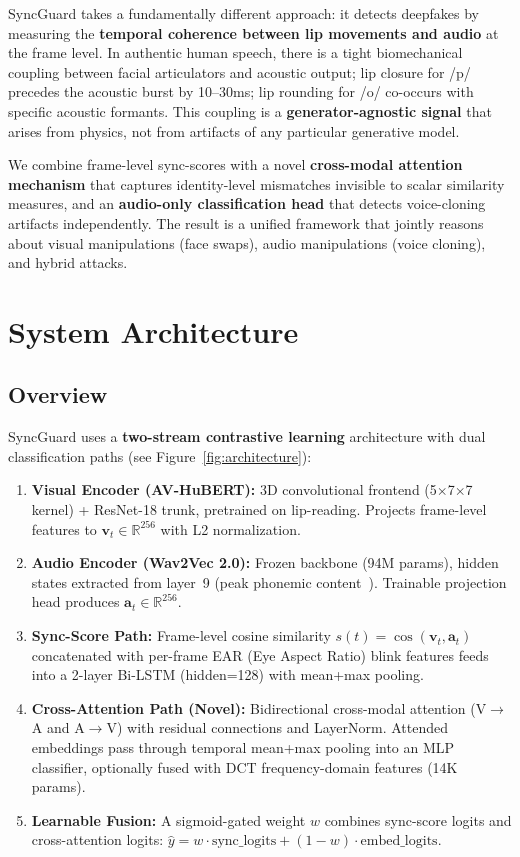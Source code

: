 \documentclass[12pt, letterpaper]{article}
\begin{document}
SyncGuard takes a fundamentally different approach: it detects deepfakes by measuring the \textbf{temporal coherence between lip movements and audio} at the frame level. In authentic human speech, there is a tight biomechanical coupling between facial articulators and acoustic output; lip closure for /p/ precedes the acoustic burst by 10--30ms; lip rounding for /o/ co-occurs with specific acoustic formants. This coupling is a \textbf{generator-agnostic signal} that arises from physics, not from artifacts of any particular generative model.

We combine frame-level sync-scores with a novel \textbf{cross-modal attention mechanism} that captures identity-level mismatches invisible to scalar similarity measures, and an \textbf{audio-only classification head} that detects voice-cloning artifacts independently. The result is a unified framework that jointly reasons about visual manipulations (face swaps), audio manipulations (voice cloning), and hybrid attacks.

\section{System Architecture}

\subsection{Overview}

SyncGuard uses a \textbf{two-stream contrastive learning} architecture with dual classification paths (see Figure~\ref{fig:architecture}):

\begin{enumerate}[leftmargin=1.5em, itemsep=2pt]
    \item \textbf{Visual Encoder (AV-HuBERT):} 3D convolutional frontend (5$\times$7$\times$7 kernel) + ResNet-18 trunk, pretrained on lip-reading. Projects frame-level features to $\mathbf{v}_t \in \mathbb{R}^{256}$ with L2 normalization.
    \item \textbf{Audio Encoder (Wav2Vec 2.0):} Frozen backbone (94M params), hidden states extracted from layer~9 (peak phonemic content~\cite{pasad2021}). Trainable projection head produces $\mathbf{a}_t \in \mathbb{R}^{256}$.
    \item \textbf{Sync-Score Path:} Frame-level cosine similarity $s(t) = \cos(\mathbf{v}_t, \mathbf{a}_t)$ concatenated with per-frame EAR (Eye Aspect Ratio) blink features feeds into a 2-layer Bi-LSTM (hidden=128) with mean+max pooling.
    \item \textbf{Cross-Attention Path (Novel):} Bidirectional cross-modal attention (V$\to$A and A$\to$V) with residual connections and LayerNorm. Attended embeddings pass through temporal mean+max pooling into an MLP classifier, optionally fused with DCT frequency-domain features (14K params).
    \item \textbf{Learnable Fusion:} A sigmoid-gated weight $w$ combines sync-score logits and cross-attention logits: $\hat{y} = w \cdot \text{sync\_logits} + (1-w) \cdot \text{embed\_logits}$.
\end{enumerate}
\end{document}
